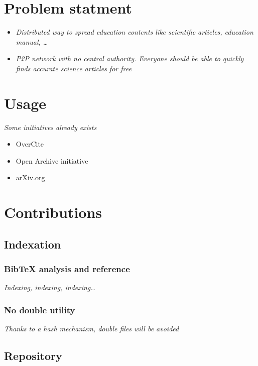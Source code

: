\section{Problem statment}

\begin{itemize}
\item \textit{Distributed way to spread education contents like
scientific articles, education manual, \ldots}
\item \textit{P2P network with no central authority. Everyone should be
able to quickly finds accurate science articles for free}
\end{itemize}

\section{Usage}

\textit{Some initiatives already exists}

\begin{itemize}
\item OverCite
\item Open Archive initiative
\item arXiv.org
\end{itemize}

\section{Contributions}

\subsection{Indexation}

\subsubsection{Bib\TeX{} analysis and reference}

\textit{Indexing, indexing, indexing\ldots}

\subsubsection{No double utility}

\textit{Thanks to a hash mechanism, double files
will be avoided}

\subsection{Repository}


